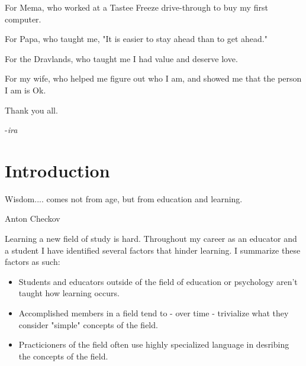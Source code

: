 \documentclass[11pt,fleqn]{book} %
\begin{document}
\pagestyle{empty} %
\cleardoublepage %

For Mema, who worked at a Tastee Freeze drive-through to buy my first computer.

For Papa, who taught me, "It is easier to stay ahead than to get ahead."

For the Dravlands, who taught me I had value and deserve love.

For my wife, who helped me figure out who I am, and showed me that the person I am is Ok.

Thank you all.

-\textit{ira}




\pagestyle{empty} %

\tableofcontents %

\cleardoublepage %

\pagestyle{fancy} %

\chapter*{Introduction}

\epigraph{Wisdom.... comes not from age, but from education and learning.}{Anton Checkov}

Learning a new field of study is hard.  Throughout my career as an educator and a student I have identified several factors that hinder learning.  I summarize these factors as such:

\begin{itemize}

\item Students and educators outside of the field of education or psychology aren't taught how learning occurs.

\item Accomplished members in a field tend to - over time - trivialize what they consider "simple" concepts of the field.

\item Practicioners of the field often use highly specialized language in desribing the concepts of the field.

\end{itemize}
\end{document}
